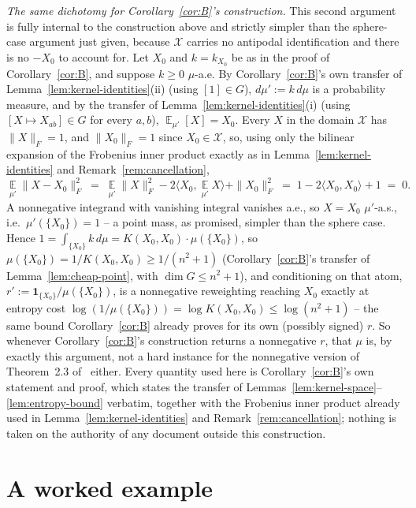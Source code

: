 \documentclass{aicr-solution}
\newcommand{\Expect}{\operatorname*{\mathbb{E}}}
\begin{document}
\begin{remark}[scope]
\medskip
\noindent\emph{The same dichotomy for Corollary~\ref{cor:B}'s
construction.} This second argument is fully internal to the
construction above and strictly simpler than the sphere-case argument
just given, because $\mathcal{X}$ carries no antipodal identification
and there is no $-X_{0}$ to account for. Let $X_{0}$ and $k =
k_{X_{0}}$ be as in the proof of Corollary~\ref{cor:B}, and suppose $k
\ge 0$ $\mu$-a.e. By Corollary~\ref{cor:B}'s own transfer of
Lemma~\ref{lem:kernel-identities}(ii) (using $[1] \in G$), $d\mu' :=
k\,d\mu$ is a probability measure, and by the transfer of
Lemma~\ref{lem:kernel-identities}(i) (using $[X \mapsto X_{ab}] \in G$
for every $a,b$), $\Expect_{\mu'}[X] = X_{0}$. Every $X$ in the domain
$\mathcal{X}$ has $\|X\|_{F} = 1$, and $\|X_{0}\|_{F} = 1$ since $X_{0}
\in \mathcal{X}$, so, using only the bilinear expansion of the
Frobenius inner product exactly as in Lemma~\ref{lem:kernel-identities}
and Remark~\ref{rem:cancellation},
\[
  \Expect_{\mu'}\big\|X-X_{0}\big\|_{F}^{2} \;=\; \Expect_{\mu'}
  \|X\|_{F}^{2} - 2\langle X_{0}, \Expect_{\mu'}X\rangle +
  \|X_{0}\|_{F}^{2} \;=\; 1 - 2\langle X_{0},X_{0}\rangle + 1 \;=\; 0.
\]
A nonnegative integrand with vanishing integral vanishes a.e., so $X =
X_{0}$ $\mu'$-a.s., i.e.\ $\mu'(\{X_{0}\}) = 1$ -- a point mass, as
promised, simpler than the sphere case. Hence $1 =
\int_{\{X_{0}\}}k\,d\mu = K(X_{0},X_{0})\cdot\mu(\{X_{0}\})$, so
$\mu(\{X_{0}\}) = 1/K(X_{0},X_{0}) \ge 1/(n^{2}+1)$ (Corollary~\ref{cor:B}'s
transfer of Lemma~\ref{lem:cheap-point}, with $\dim G \le n^{2}+1$),
and conditioning on that atom, $r' := \mathbf{1}_{\{X_{0}\}}/\mu(\{X_{0}\})$,
is a nonnegative reweighting reaching $X_{0}$ exactly at entropy cost
$\log(1/\mu(\{X_{0}\})) = \log K(X_{0},X_{0}) \le \log(n^{2}+1)$ -- the
same bound Corollary~\ref{cor:B} already proves for its own (possibly
signed) $r$. So whenever Corollary~\ref{cor:B}'s construction returns
a nonnegative $r$, that $\mu$ is, by exactly this argument, not a hard
instance for the nonnegative version of Theorem~2.3 of~\cite{BKS16}
either. Every quantity used here is Corollary~\ref{cor:B}'s own
statement and proof, which states the transfer of
Lemmas~\ref{lem:kernel-space}--\ref{lem:entropy-bound} verbatim,
together with the Frobenius inner product already used in
Lemma~\ref{lem:kernel-identities} and Remark~\ref{rem:cancellation};
nothing is taken on the authority of any document outside this
construction.
\end{remark}

\section{A worked example}\label{sec:example}
\end{document}
